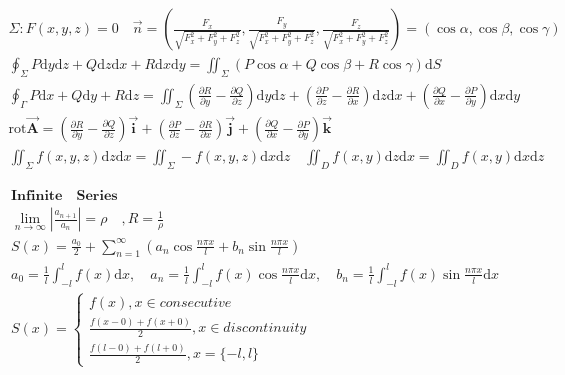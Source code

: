 \documentclass{article}
\begin{document}
\begin{align*}
    \Sigma:F(x,y,z)=0 \quad \vec{n}=\left(\frac{F_{x}}{\sqrt{F_{x}^2+F_{y}^2+F_{z}^2}},\frac{F_{y}}{\sqrt{F_{x}^2+F_{y}^2+F_{z}^2}},\frac{F_{z}}{\sqrt{F_{x}^2+F_{y}^2+F_{z}^2}}\right) = (\cos \alpha,\cos \beta,\cos \gamma)\\
    \oint_{\Sigma}P\mathrm{d}y\mathrm{d}z+Q\mathrm{d}z\mathrm{d}x+R\mathrm{d}x\mathrm{d}y = \iint_{\Sigma}(P\cos \alpha+Q\cos \beta+R\cos \gamma )\mathrm{d}S\\  
    \oint_{\Gamma}P\mathrm{d}x+Q\mathrm{d}y +R\mathrm{d}z = \iint_{\Sigma}\left(\frac{\partial R}{\partial y}-\frac{\partial Q}{\partial z}\right)\mathrm{d}y\mathrm{d}z+\left(\frac{\partial P}{\partial z}-\frac{\partial R}{\partial x}\right)\mathrm{d}z\mathrm{d}x+\left(\frac{\partial Q}{\partial x}-\frac{\partial P}{\partial y}\right)\mathrm{d}x\mathrm{d}y \\
    \bm{\mathrm{rot}\vec{A}} = \left(\frac{\partial R}{\partial y}-\frac{\partial Q}{\partial z}\right)\bm{\vec{i}}+\left(\frac{\partial P}{\partial z}-\frac{\partial R}{\partial x}\right)\bm{\vec{j}}+\left(\frac{\partial Q}{\partial x}-\frac{\partial P}{\partial y}\right)\bm{\vec{k}}\\
    \iint_{\Sigma} f(x,y,z) \mathrm{d}z\mathrm{d}x = \iint_{\Sigma} -f(x,y,z) \mathrm{d}x\mathrm{d}z \quad \iint_{D}f(x,y)\mathrm{d}z\mathrm{d}x = \iint_{D}f(x,y)\mathrm{d}x\mathrm{d}z
\end{align*}

\begin{align*}
    \bm{Infinite \quad Series} \\ 
    \lim_{n \to \infty} |\frac{a_{n+1}}{a_{n}}| = \rho \quad, R = \frac{1}{\rho} \\ 
    S(x) = \frac{a_{0}}{2} + \sum_{n=1}^{\infty}(a_{n}\cos{\frac{n\pi x}{l}} + b_{n}\sin{\frac{n\pi x}{l}}) \\ 
    a_{0} = \frac{1}{l}\int_{-l}^{l}f(x)\mathrm{d}x ,\quad a_{n} = \frac{1}{l}\int_{-l}^{l}f(x)\cos{\frac{n\pi x}{l}}\mathrm{d}x ,\quad b_{n} = \frac{1}{l}\int_{-l}^{l}f(x)\sin{\frac{n\pi x}{l}}\mathrm{d}x \\ 
    S(x) = \left\{ 
    \begin{array}{rl} 
        f(x),x \in consecutive \\ 
        \frac{f(x-0)+f(x+0)}{2},x \in discontinuity \\  
        \frac{f(l-0)+f(l+0)}{2},x = \{-l,l\} 
    \end{array} \right. \ \\ 
\end{align*}
\end{document}
